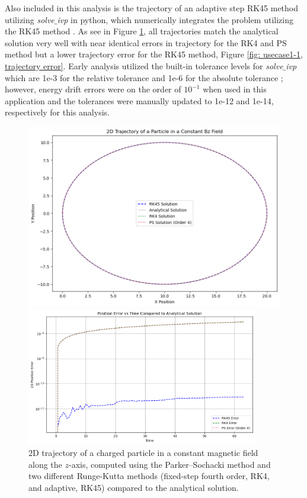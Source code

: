 \documentclass{article}
\begin{document}
Also included in this analysis is the trajectory of an adaptive step RK45 method utilizing \textit{solve$\_$ivp} in python, which numerically integrates the problem utilizing the RK45 method \cite{scipy}. As see in Figure \ref{fig: usecase1-1, trajectory}, all trajectories match the analytical solution very well with near identical errors in trajectory for the RK4 and PS method but a lower trajectory error for the RK45 method, Figure \ref{fig: usecase1-1, trajectory error}. Early analysis utilized the built-in tolerance levels for \textit{solve$\_$ivp} which are 1e-3 for the relative tolerance and 1e-6 for the absolute tolerance \cite{scipy}; however, energy drift errors were on the order of $10^{-1}$ when used in this application and the tolerances were manually updated to 1e-12 and 1e-14, respectively for this analysis. 
        \begin{figure}[H]
            \centering
            \begin{minipage}[t]{0.48\textwidth}
                \centering
        \includegraphics[width=.9\textwidth]{Images/ConstantB/PS_Order4_trajectory_comparison_UseCase1-1.png}
        \caption{2D trajectory of a charged particle in a constant magnetic field along the $z$-axis, computed using the Parker–Sochacki method and two different Runge-Kutta methods (fixed-step fourth order, RK4, and adaptive, RK45) compared to the analytical solution.}
        \label{fig: usecase1-1, trajectory}
            \end{minipage}%
            \hfill
            \begin{minipage}[t]{.48\textwidth}
                \centering
                \includegraphics[width=0.9\textwidth]{Images/ConstantB/PS_Order4_trajerror_comparison_UseCase1-1.png}

\end{minipage}
\end{figure}
\end{document}

